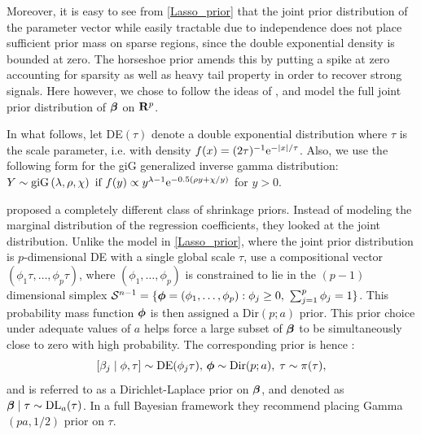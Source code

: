 \documentclass[ba]{imsart}
\begin{document}
Moreover, it is easy to see from \eqref{Lasso_prior} that the joint prior distribution of the parameter vector while easily tractable due to independence does not place sufficient prior mass on sparse regions, since the double exponential density is bounded at zero. The horseshoe prior amends this by putting a spike at zero accounting for sparsity as well as heavy tail property in order to recover strong signals. Here however, we chose to follow the ideas of \citep{bhattacharya2014dirichlet}, and model the full joint prior distribution of $\boldsymbol{\beta}$ on ${\bf R}^p$.

In what follows, let \rm{DE}$(\tau )$ denote a double exponential distribution where $\tau$ is the scale parameter, \rm{i.e.}  with density $f(x) = (2\tau)^{-1} {\rm e}^{-\lvert x\rvert/ \tau }$. Also, we use the following form for the \rm{giG} generalized inverse gamma distribution: $Y\sim\text{\rm{giG}} \left(\lambda,\rho , \chi \right) \text{ if } f(y) \propto y^{\lambda - 1} {\rm e}^{-0.5 \left( \rho y + \chi /y \right) }  $ for $y > 0$.

\cite{bhattacharya2014dirichlet} proposed a completely different class of shrinkage priors. Instead of modeling the marginal distribution of the regression coefficients, they looked at the joint distribution. Unlike the model in \eqref{Lasso_prior}, where the joint prior distribution is $p$-dimensional \rm{DE} with a single global scale $\tau$, \cite{bhattacharya2014dirichlet} use a compositional vector $\left(\phi_1 \tau , \ldots , \phi_p \tau \right)$, where $ \left( \phi_1 , \ldots , \phi_p \right) $ is constrained to lie in the $ (p - 1) $ dimensional simplex $\mathcal{S}^{n-1} = \{ \boldsymbol{\phi} = (\phi_1 , \ldots , \phi_p ) : \phi_j \geq 0, \ \sum_{j = 1}^{p} \phi_j = 1 \}$. This probability mass function $\boldsymbol{\phi}$ is then assigned a \rm{Dir}$(p; a)$ prior. This prior choice under adequate values of $a$ helps force a large subset of $\boldsymbol{\beta}$ to be simultaneously close to zero with high probability. The corresponding prior is hence :\[ [\beta_j \mid \phi , \tau] \sim \text{\rm{DE}}(\phi_j \tau), \, \boldsymbol{\phi} \sim \text{\rm{Dir}}(p;a), \; \tau \sim \pi(\tau),\] and is referred to as a Dirichlet-Laplace prior on $\boldsymbol{\beta}$, and denoted as $\boldsymbol{\beta} \mid \tau \sim \text{\rm{DL}}_a(\tau)$. In a full Bayesian framework they recommend placing \rm{Gamma}$(pa ,1/2)$ prior on $\tau$. 
\end{document}
